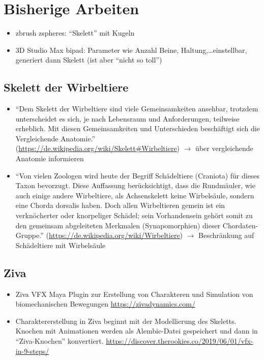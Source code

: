 
\chapter{Bisherige Arbeiten}

\begin{itemize}
 \item zbrush zspheres: "`Skelett"' mit Kugeln %
 \item 3D Studio Max bipad: Parameter wie Anzahl Beine, Haltung,\dots einstellbar, generiert dann Skelett (ist aber "`nicht so toll"') %
\end{itemize}

\section{Skelett der Wirbeltiere}

\begin{itemize}
 \item "`Dem Skelett der Wirbeltiere sind viele Gemeinsamkeiten ansehbar, trotzdem unterscheidet es sich, je nach Lebensraum und Anforderungen, teilweise erheblich. Mit diesen Gemeinsamkeiten und Unterschieden beschäftigt sich die Vergleichende Anatomie."' (\url{https://de.wikipedia.org/wiki/Skelett#Wirbeltiere}) $\rightarrow$ über vergleichende Anatomie informieren
 \item "`Von vielen Zoologen wird heute der Begriff Schädeltiere (Craniota) für dieses Taxon bevorzugt. Diese Auffassung berücksichtigt, dass die Rundmäuler, wie auch einige andere Wirbeltiere, als Achsenskelett keine Wirbelsäule, sondern eine Chorda dorsalis haben. Doch allen Wirbeltieren gemein ist ein verknöcherter oder knorpeliger Schädel; sein Vorhandensein gehört somit zu den gemeinsam abgeleiteten Merkmalen (Synapomorphien) dieser Chordaten-Gruppe."' (\url{https://de.wikipedia.org/wiki/Wirbeltiere}) $\rightarrow$ Beschränkung auf Schädeltiere mit Wirbelsäule
\end{itemize}

\section{Ziva}

\begin{itemize}
 \item Ziva VFX Maya Plugin zur Erstellung von Charakteren und Simulation von biomechanischen Bewegungen \url{https://zivadynamics.com/}
 \item Charaktererstellung in Ziva beginnt mit der Modellierung des Skeletts. Knochen mit Animationen werden als Alembic-Datei gespeichert und dann in "`Ziva-Knochen"' konvertiert. \url{https://discover.therookies.co/2019/06/01/vfx-in-9-steps/}
\end{itemize}


